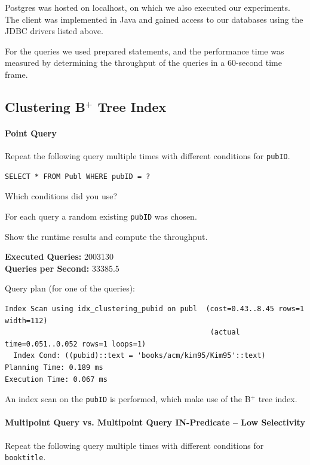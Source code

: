 \documentclass[11pt]{scrartcl}
\begin{document}
Postgres was hosted on localhost, on which we also executed our experiments.
The client was implemented in Java and gained access to our databases using the JDBC drivers listed above.

For the queries we used prepared statements, and the performance time was measured by determining the throughput of the
queries in a 60-second time frame.

\subsection*{Clustering B$^+$ Tree Index}

\paragraph{Point Query}

Repeat the following query multiple times with different conditions for \texttt{pubID}.

\begin{lstlisting}[style=dbtsql]
SELECT * FROM Publ WHERE pubID = ?
\end{lstlisting}

Which conditions did you use?

For each query a random existing \texttt{pubID} was chosen.

Show the runtime results and compute the throughput.

\textbf{Executed Queries: } 2003130 \\
\textbf{Queries per Second: } 33385.5

Query plan (for one of the queries):

{\small
\parskip0pt\begin{verbatim}
Index Scan using idx_clustering_pubid on publ  (cost=0.43..8.45 rows=1 width=112)
                                                (actual time=0.051..0.052 rows=1 loops=1)
  Index Cond: ((pubid)::text = 'books/acm/kim95/Kim95'::text)
Planning Time: 0.189 ms
Execution Time: 0.067 ms
\end{verbatim}}

An index scan on the \texttt{pubID} is performed, which make use of the B$^+$ tree index.

\paragraph{Multipoint Query vs. Multipoint Query IN-Predicate -- Low Selectivity}

Repeat the following query multiple times with different conditions for \texttt{booktitle}.
\end{document}
